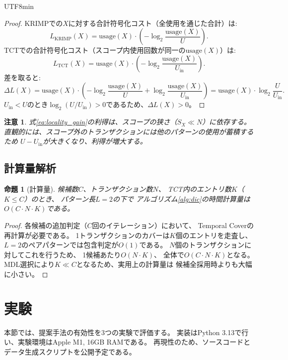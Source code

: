 \documentclass[11pt,a4paper]{article}
\newtheorem{proposition}[theorem]{命題}
\newtheorem{remark}{注意}
\begin{document}
\begin{CJK}{UTF8}{min}
\begin{proof}
KRIMPでの$X$に対する合計符号化コスト（全使用を通じた合計）は:
\[
  L_{\text{KRIMP}}(X) = \text{usage}(X) \cdot \left(-\log_2 \frac{\text{usage}(X)}{U}\right).
\]
TCTでの合計符号化コスト（スコープ内使用回数が同一の$\text{usage}(X)$）は:
\[
  L_{\text{TCT}}(X) = \text{usage}(X) \cdot \left(-\log_2 \frac{\text{usage}(X)}{U_{\text{in}}}\right).
\]
差を取ると:
\[
  \Delta L(X) = \text{usage}(X) \cdot \left(-\log_2 \frac{\text{usage}(X)}{U} + \log_2 \frac{\text{usage}(X)}{U_{\text{in}}}\right)
  = \text{usage}(X) \cdot \log_2 \frac{U}{U_{\text{in}}}.
\]
$U_{\text{in}} < U$のとき$\log_2(U/U_{\text{in}}) > 0$であるため、$\Delta L(X) > 0$。
\end{proof}

\begin{remark}
式\ref{eq:locality_gain}の利得は、スコープの狭さ（$S_X \ll N$）に依存する。
直観的には、スコープ外のトランザクションには他のパターンの使用が蓄積するため
$U - U_{\text{in}}$が大きくなり、利得が増大する。
\end{remark}

\subsection{計算量解析}

\begin{proposition}[計算量]\label{prop:complexity}
候補数$C$、トランザクション数$N$、
TCT内のエントリ数$K$（$K \leq C$）のとき、
パターン長$L{=}2$の下で
アルゴリズム\ref{alg:dic}の時間計算量は$O(C \cdot N \cdot K)$である。
\end{proposition}

\begin{proof}
各候補の追加判定（$C$回のイテレーション）において、
Temporal Coverの再計算が必要である。
1トランザクションのカバーは$K$個のエントリを走査し、
$L{=}2$のペアパターンでは包含判定が$O(1)$である。
$N$個のトランザクションに対してこれを行うため、
1候補あたり$O(N \cdot K)$、
全体で$O(C \cdot N \cdot K)$となる。
MDL選択により$K \ll C$となるため、実用上の計算量は
候補全採用時よりも大幅に小さい。
\end{proof}


\section{実験}\label{sec:experiments}

本節では、提案手法の有効性を3つの実験で評価する。
実装はPython 3.13で行い、実験環境はApple M1, 16GB RAMである。
再現性のため、ソースコードとデータ生成スクリプトを公開予定である。


\end{CJK}
\end{document}
